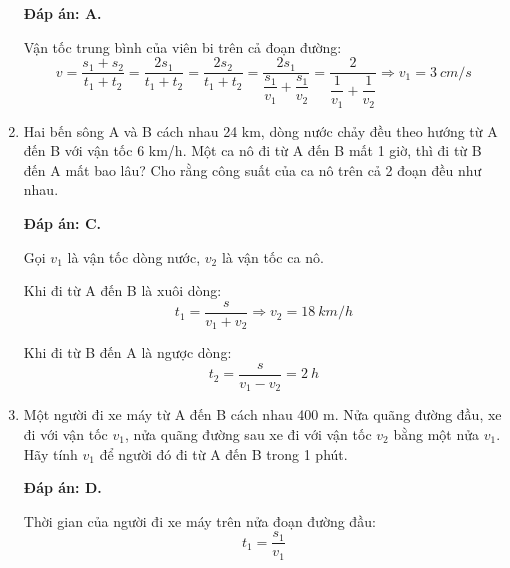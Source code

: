 \begin{enumerate}[label=\bfseries Câu \arabic*:]
{	}
	
	\hideall
	{\textbf{Đáp án: A.}
		
		Vận tốc trung bình của viên bi trên cả đoạn đường:
		$$v=\dfrac{s_1+s_2}{t_1+t_2} = \dfrac{2s_1}{t_1+t_2} = \dfrac{2s_2}{t_1+t_2} = \dfrac{2s_1}{\dfrac{s_1}{v_1}+\dfrac{s_1}{v_2}} = \dfrac{2}{\dfrac{1}{v_1}+\dfrac{1}{v_2}} \Rightarrow v_1 = \SI{3}{cm/s}$$
	}
	\item {}
	
	
	{Hai bến sông A và B cách nhau 24 km, dòng nước chảy đều theo hướng từ A đến B với vận tốc 6 km/h. Một ca nô đi từ A đến B mất 1 giờ, thì đi từ B đến A mất bao lâu? Cho rằng công suất của ca nô trên cả 2 đoạn đều như nhau.
		
		
	}
	
	\hideall
	{\textbf{Đáp án: C.}
		
		Gọi $v_1$ là vận tốc dòng nước, $v_2$ là vận tốc ca nô.
		
		Khi đi từ A đến B là xuôi dòng:
		$$t_1 = \dfrac{s}{v_1+v_2} \Rightarrow v_2=\SI{18}{km/h}$$
		
		Khi đi từ B đến A là ngược dòng:
		$$t_2=\dfrac{s}{v_1-v_2} = \SI{2}{h}$$
	}
	\item {}
	
	
	{Một người đi xe máy từ A đến B cách nhau 400 m. Nửa quãng đường đầu, xe đi với vận tốc $v_1$, nửa quãng đường sau xe đi với vận tốc $v_2$ bằng một nửa $v_1$. Hãy tính $v_1$ để người đó đi từ A đến B trong 1 phút.
		
		
	}
	
	\hideall
	{\textbf{Đáp án: D.}
		
		Thời gian của người đi xe máy trên nửa đoạn đường đầu:
		$$t_1 = \dfrac{s_1}{v_1}$$
		
}
\end{enumerate}
